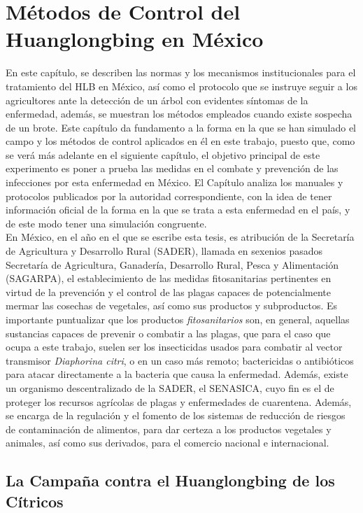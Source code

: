 \chapter{Métodos de Control del Huanglongbing en México}

En este capítulo, se describen las normas y los mecanismos institucionales para el tratamiento del HLB en México, así como el protocolo que se instruye seguir a los agricultores ante la detección de un árbol con evidentes síntomas de la enfermedad, además, se muestran los métodos empleados cuando existe sospecha de un brote. Este capítulo da fundamento a la forma en la que se han simulado el campo y los métodos de control aplicados en él en este trabajo, puesto que, como se verá más adelante en el siguiente capítulo, el objetivo principal de este experimento es poner a prueba las medidas en el combate y prevención de las infecciones por esta enfermedad en México. El Capítulo analiza los manuales y protocolos publicados por la autoridad correspondiente, con la idea de tener información oficial de la forma en la que se trata a esta enfermedad en el país, y de este modo tener una simulación congruente.\\
En México, en el año en el que se escribe esta tesis, es atribución de la Secretaría de Agricultura y Desarrollo Rural (SADER), llamada en sexenios pasados Secretaría de Agricultura, Ganadería, Desarrollo Rural, Pesca y Alimentación (SAGARPA), el establecimiento de las medidas fitosanitarias pertinentes en virtud de la  prevención y el control de las plagas capaces de potencialmente mermar las cosechas de vegetales, así como sus productos y subproductos. Es importante puntualizar que los productos \textit{fitosanitarios} son, en general, aquellas sustancias capaces de prevenir o combatir a las plagas, que para el caso que ocupa a este trabajo, suelen ser los insecticidas usados para combatir al vector transmisor \textit{Diaphorina citri}, o en un caso más remoto; bactericidas o antibióticos para atacar directamente a la bacteria que causa la enfermedad. Además, existe un organismo descentralizado de la SADER, el SENASICA, cuyo fin es el de proteger los recursos agrícolas de plagas y enfermedades de cuarentena. Además, se encarga de la regulación y el fomento de los sistemas de reducción de riesgos de contaminación de alimentos, para dar certeza a los productos vegetales y animales, así como sus derivados, para el comercio nacional e internacional.\cite{cortez2010control}

\section{La Campaña contra el Huanglongbing de los Cítricos}

